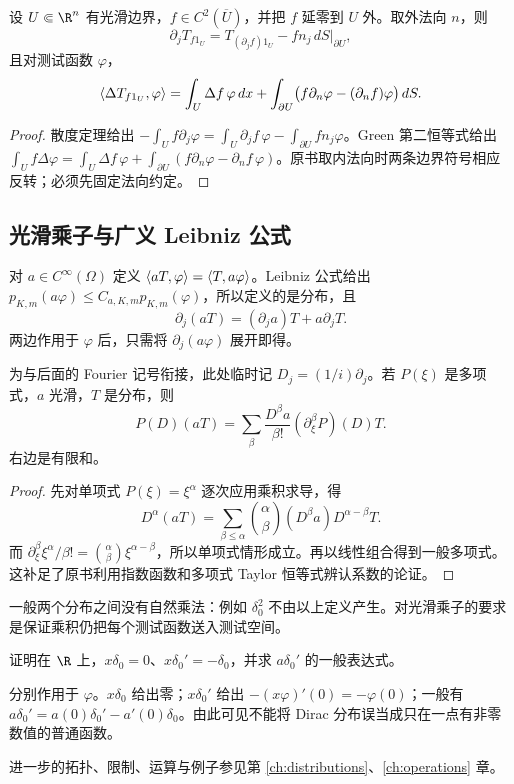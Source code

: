 \begin{proposition}\label{prop:y1-boundary-distribution}
设 $U\Subset\R^n$ 有光滑边界，$f\in C^2(\overline U)$，并把 $f$ 延零到 $U$ 外。取外法向 $n$，则
\[
 \partial_jT_{f1_U}=T_{(\partial_jf)1_U}
 -f n_j\,dS\big|_{\partial U},
\]
且对测试函数 $\varphi$，
\[
 \langle \Delta T_{f1_U},\varphi\rangle
 =\int_U\Delta f\,\varphi\,dx
 +\int_{\partial U}\bigl(f\partial_n\varphi-(\partial_nf)\varphi\bigr)\,dS.
\]
\end{proposition}
\begin{proof}
散度定理给出 $-\int_U f\partial_j\varphi=\int_U\partial_jf\,\varphi-\int_{\partial U}fn_j\varphi$。Green 第二恒等式给出 $\int_U f\Delta\varphi=\int_U\Delta f\,\varphi+\int_{\partial U}(f\partial_n\varphi-\partial_nf\,\varphi)$。原书取内法向时两条边界符号相应反转；必须先固定法向约定。
\end{proof}

\subsection{光滑乘子与广义 Leibniz 公式}
对 $a\in C^\infty(\Omega)$ 定义 $\langle aT,\varphi\rangle=\langle T,a\varphi\rangle$。Leibniz 公式给出 $p_{K,m}(a\varphi)\le C_{a,K,m}p_{K,m}(\varphi)$，所以定义的是分布，且
\[
 \partial_j(aT)=(\partial_ja)T+a\partial_jT.
\]
两边作用于 $\varphi$ 后，只需将 $\partial_j(a\varphi)$ 展开即得。

\begin{theorem}\label{thm:y1-general-leibniz}
为与后面的 Fourier 记号衔接，此处临时记 $D_j=(1/i)\partial_j$。若 $P(\xi)$ 是多项式，$a$ 光滑，$T$ 是分布，则
\[
 P(D)(aT)=\sum_\beta\frac{D^\beta a}{\beta!}
 (\partial_\xi^\beta P)(D)T.
\]
右边是有限和。
\end{theorem}
\begin{proof}
先对单项式 $P(\xi)=\xi^\alpha$ 逐次应用乘积求导，得
\[
 D^\alpha(aT)=\sum_{\beta\le\alpha}\binom\alpha\beta
 (D^\beta a)D^{\alpha-\beta}T.
\]
而 $\partial_\xi^\beta\xi^\alpha/\beta!=\binom\alpha\beta\xi^{\alpha-\beta}$，所以单项式情形成立。再以线性组合得到一般多项式。这补足了原书利用指数函数和多项式 Taylor 恒等式辨认系数的论证。
\end{proof}
一般两个分布之间没有自然乘法：例如 $\delta_0^2$ 不由以上定义产生。对光滑乘子的要求是保证乘积仍把每个测试函数送入测试空间。

\begin{exercise}
证明在 $\R$ 上，$x\delta_0=0$、$x\delta_0'=-\delta_0$，并求 $a\delta_0'$ 的一般表达式。
\end{exercise}
\begin{solution}
分别作用于 $\varphi$。$x\delta_0$ 给出零；$x\delta_0'$ 给出 $-(x\varphi)'(0)=-\varphi(0)$；一般有 $a\delta_0'=a(0)\delta_0'-a'(0)\delta_0$。由此可见不能将 Dirac 分布误当成只在一点有非零数值的普通函数。
\end{solution}
进一步的拓扑、限制、运算与例子参见第 \ref{ch:distributions}、\ref{ch:operations} 章。
